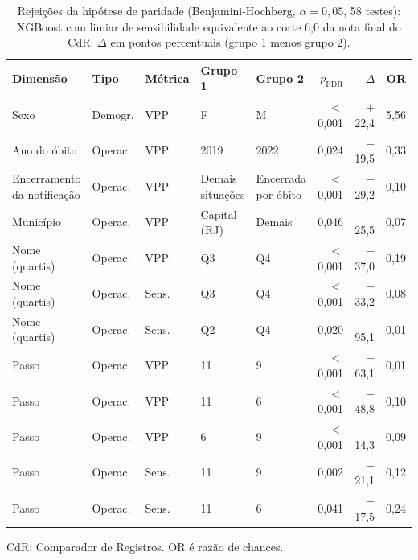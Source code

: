 \begin{table}[htbp]
\centering
\caption{Rejei\c{c}\~oes da hip\'otese de paridade (Benjamini-Hochberg, $\alpha = 0{,}05$, 58 testes): XGBoost com limiar de sensibilidade equivalente ao corte 6{,}0 da nota final do CdR. $\Delta$ em pontos percentuais (grupo 1 menos grupo 2).}
\label{tab:qw3-fairness-rejections}
\footnotesize\setlength{\tabcolsep}{3pt}
\begin{tabular}{lllllrrr}
\toprule
Dimens\~ao & Tipo & M\'etrica & Grupo 1 & Grupo 2 & $p_{\mathrm{FDR}}$ & $\Delta$ & OR \\
\midrule
Sexo & Demogr. & VPP & F & M & $<$0{,}001 & $+$22{,}4 & 5{,}56 \\
Ano do \'obito & Operac. & VPP & 2019 & 2022 & 0{,}024 & $-$19{,}5 & 0{,}33 \\
Encerramento da notifica\c{c}\~ao & Operac. & VPP & Demais situa\c{c}\~oes & Encerrada por \'obito & $<$0{,}001 & $-$29{,}2 & 0{,}10 \\
Munic\'ipio & Operac. & VPP & Capital (RJ) & Demais & 0{,}046 & $-$25{,}5 & 0{,}07 \\
Nome (quartis) & Operac. & VPP & Q3 & Q4 & $<$0{,}001 & $-$37{,}0 & 0{,}19 \\
Nome (quartis) & Operac. & Sens. & Q3 & Q4 & $<$0{,}001 & $-$33{,}2 & 0{,}08 \\
Nome (quartis) & Operac. & Sens. & Q2 & Q4 & 0{,}020 & $-$95{,}1 & 0{,}01 \\
Passo & Operac. & VPP & 11 & 9 & $<$0{,}001 & $-$63{,}1 & 0{,}01 \\
Passo & Operac. & VPP & 11 & 6 & $<$0{,}001 & $-$48{,}8 & 0{,}10 \\
Passo & Operac. & VPP & 6 & 9 & $<$0{,}001 & $-$14{,}3 & 0{,}09 \\
Passo & Operac. & Sens. & 11 & 9 & 0{,}002 & $-$21{,}1 & 0{,}12 \\
Passo & Operac. & Sens. & 11 & 6 & 0{,}041 & $-$17{,}5 & 0{,}24 \\
\bottomrule
\end{tabular}
\par\footnotesize CdR: Comparador de Registros. OR é razão de chances.
\end{table}
